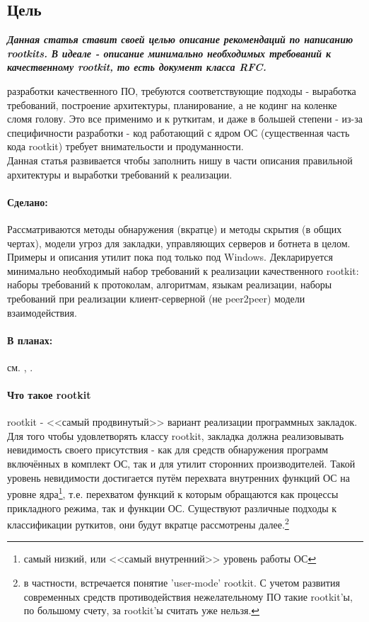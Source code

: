 \subsection{Цель}
%
%
{\sl\bf
 Данная статья ставит своей целью описание рекомендаций по написанию
rootkits. В идеале - описание минимально необходимых требований к
качественному rootkit, то есть документ класса RFC.
}

{ разработки качественного ПО, требуются соответствующие подходы
 - выработка требований, построение архитектуры, планирование, а не
 кодинг на коленке сломя голову. Это все применимо и к руткитам, и
даже в большей степени - из-за специфичности разработки - код работающий
с ядром ОС (существенная часть кода rootkit) требует внимательости и продуманности.}\\

Данная статья развивается чтобы заполнить нишу в части описания правильной архитектуры и
выработки требований к реализации.


\paragraph{Сделано:\\}
Рассматриваются методы обнаружения (вкратце) и методы скрытия (в общих
чертах), модели угроз для закладки, управляющих серверов и ботнета в целом.
Примеры и описания утилит пока под только под Windows. Декларируется
минимально необходимый набор требований к реализации качественного rootkit:
наборы требований к протоколам, алгоритмам, языкам реализации, наборы требований при реализации
клиент-серверной (не peer2peer) модели взаимодействия.

\paragraph{В планах:\\}
см. \pageref{paper_2do_1}, \pageref{paper_2do_2} .

\paragraph{Что такое rootkit\\}

rootkit - <<самый продвинутый>> вариант реализации программных закладок.
Для того чтобы удовлетворять классу rootkit, закладка должна
реализовывать невидимость своего присутствия - как для средств
обнаружения программ включённых в комплект ОС, так и для утилит
сторонних производителей. Такой уровень невидимости достигается путём
перехвата внутренних функций ОС на уровне ядра\footnote{самый низкий,
или <<самый внутренний>> уровень работы ОС}, т.е. перехватом функций к
которым обращаются как процессы прикладного режима, так и функции ОС.
Существуют различные подходы к классификации руткитов, они будут вкратце рассмотрены
далее.\footnote{в частности, встречается понятие 'user-mode' rootkit. С учетом
развития современных средств противодействия нежелательному ПО такие rootkit'ы,
по большому счету, за rootkit'ы считать уже нельзя.}


